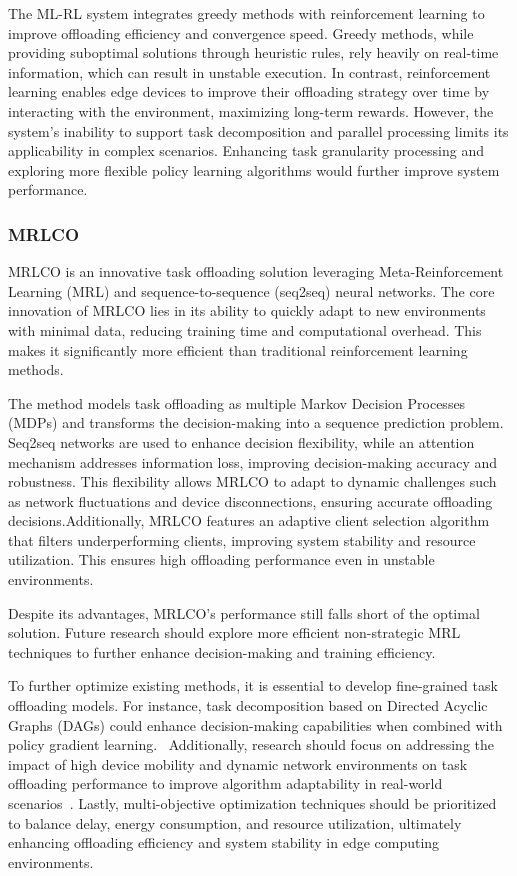 \documentclass[journal]{IEEEtran}
\begin{document}
The ML-RL system integrates greedy methods with reinforcement learning to improve offloading efficiency and convergence speed. Greedy methods, while providing suboptimal solutions through heuristic rules, rely heavily on real-time information, which can result in unstable execution. In contrast, reinforcement learning enables edge devices to improve their offloading strategy over time by interacting with the environment, maximizing long-term rewards. However, the system's inability to support task decomposition and parallel processing limits its applicability in complex scenarios. Enhancing task granularity processing and exploring more flexible policy learning algorithms would further improve system performance.~\cite{zhou04}

\subsubsection{MRLCO}

MRLCO is an innovative task offloading solution leveraging Meta-Reinforcement Learning (MRL) and sequence-to-sequence (seq2seq) neural networks. The core innovation of MRLCO lies in its ability to quickly adapt to new environments with minimal data, reducing training time and computational overhead. This makes it significantly more efficient than traditional reinforcement learning methods.

The method models task offloading as multiple Markov Decision Processes (MDPs) and transforms the decision-making into a sequence prediction problem. Seq2seq networks are used to enhance decision flexibility, while an attention mechanism addresses information loss, improving decision-making accuracy and robustness. This flexibility allows MRLCO to adapt to dynamic challenges such as network fluctuations and device disconnections, ensuring accurate offloading decisions.Additionally, MRLCO features an adaptive client selection algorithm that filters underperforming clients, improving system stability and resource utilization. This ensures high offloading performance even in unstable environments.

Despite its advantages, MRLCO's performance still falls short of the optimal solution. Future research should explore more efficient non-strategic MRL techniques to further enhance decision-making and training efficiency.~\cite{zhou05}


To further optimize existing methods, it is essential to develop fine-grained task offloading models. For instance, task decomposition based on Directed Acyclic Graphs (DAGs) could enhance decision-making capabilities when combined with policy gradient learning.~\cite{zhou03} Additionally, research should focus on addressing the impact of high device mobility and dynamic network environments on task offloading performance to improve algorithm adaptability in real-world scenarios~\cite{zhou01, zhou02}. Lastly, multi-objective optimization techniques should be prioritized to balance delay, energy consumption, and resource utilization, ultimately enhancing offloading efficiency and system stability in edge computing environments.~\cite{zhou03}
\end{document}
